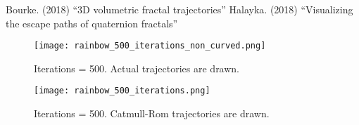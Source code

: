\documentclass[12pt]{article}
\begin{document}
\begin{thebibliography}{9}
 Bourke. (2018) ``3D volumetric fractal trajectories''
 Halayka. (2018) ``Visualizing the escape paths of quaternion fractals''
\end{thebibliography}



\pagebreak




\begin{figure} 
\centering
  \texttt{[image: rainbow\_500\_iterations\_non\_curved.png]}	
  \caption{Iterations = 500. Actual trajectories are drawn.}
\end{figure}

\begin{figure} 
\centering
  \texttt{[image: rainbow\_500\_iterations.png]}	
  \caption{Iterations = 500. Catmull-Rom trajectories are drawn.}
\end{figure}
\end{document}

